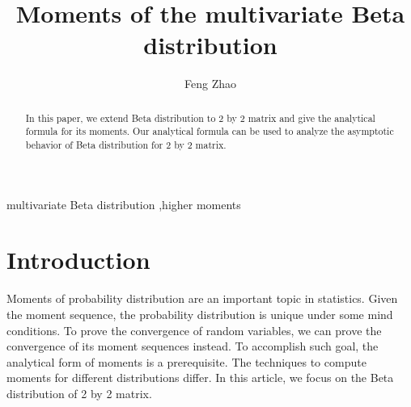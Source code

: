 \documentclass{elsarticle}
\begin{document}
\begin{frontmatter}
\title{Moments of the multivariate Beta distribution}
\author{Feng Zhao}


 \begin{abstract}
In this paper, we extend Beta distribution to 2 by 2 matrix and
give the analytical
formula for its moments. Our analytical formula can be used to analyze the asymptotic behavior of Beta distribution
for 2 by 2 matrix.
 \end{abstract}

\begin{keyword}
	multivariate Beta distribution \sep higher moments
\end{keyword}
\end{frontmatter}
\section{Introduction}
Moments of probability distribution are an important topic in statistics. Given the moment sequence,
the probability distribution is unique under some mind conditions.
To prove the convergence of random variables,  we can prove the convergence of its moment sequences instead.
To accomplish such goal, the analytical form of moments is a prerequisite. The techniques to compute moments
for different distributions differ. In this article, we focus
on the Beta distribution of 2 by 2 matrix.
\end{document}
